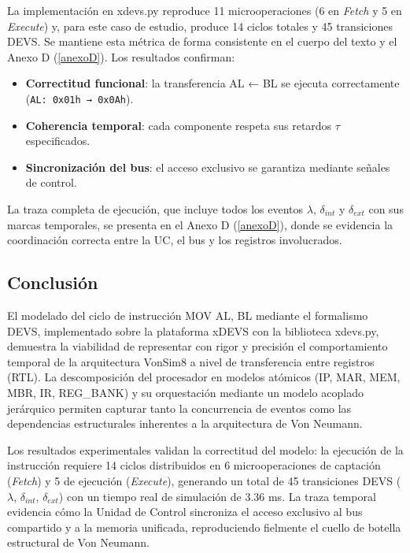 \documentclass[12pt,oneside]{templates/unerthesis}
\providecommand{\tightlist}{%
  \setlength{\itemsep}{0pt}\setlength{\parskip}{0pt}}
\begin{document}
La implementación en xdevs.py reproduce 11 microoperaciones (6 en \emph{Fetch} y 5 en \emph{Execute}) y, para este caso de estudio, produce 14 ciclos totales y 45 transiciones DEVS. Se mantiene esta métrica de forma consistente en el cuerpo del texto y el Anexo D (\ref{anexoD}). Los resultados confirman:

\begin{itemize}
\tightlist
\item
  \textbf{Correctitud funcional}: la transferencia AL ← BL se ejecuta correctamente (\texttt{AL:\ 0x01h\ →\ 0x0Ah}).
\item
  \textbf{Coherencia temporal}: cada componente respeta sus retardos \(\tau\) especificados.
\item
  \textbf{Sincronización del bus}: el acceso exclusivo se garantiza mediante señales de control.
\end{itemize}

La traza completa de ejecución, que incluye todos los eventos \(\lambda\), \(\delta_{int}\) y \(\delta_{ext}\) con sus marcas temporales, se presenta en el Anexo D (\ref{anexoD}), donde se evidencia la coordinación correcta entre la UC, el bus y los registros involucrados.

\hypertarget{conclusiuxf3n}{%
\subsection{Conclusión}\label{conclusiuxf3n}}

El modelado del ciclo de instrucción MOV AL, BL mediante el formalismo DEVS, implementado sobre la plataforma xDEVS con la biblioteca xdevs.py, demuestra la viabilidad de representar con rigor y precisión el comportamiento temporal de la arquitectura VonSim8 a nivel de transferencia entre registros (RTL). La descomposición del procesador en modelos atómicos (IP, MAR, MEM, MBR, IR, REG\_BANK) y su orquestación mediante un modelo acoplado jerárquico permiten capturar tanto la concurrencia de eventos como las dependencias estructurales inherentes a la arquitectura de Von Neumann.

Los resultados experimentales validan la correctitud del modelo: la ejecución de la instrucción requiere 14 ciclos distribuidos en 6 microoperaciones de captación (\emph{Fetch}) y 5 de ejecución (\emph{Execute}), generando un total de 45 transiciones DEVS (\(\lambda\), \(\delta_{int}\), \(\delta_{ext}\)) con un tiempo real de simulación de 3.36 ms. La traza temporal evidencia cómo la Unidad de Control sincroniza el acceso exclusivo al bus compartido y a la memoria unificada, reproduciendo fielmente el cuello de botella estructural de Von Neumann.
\end{document}

